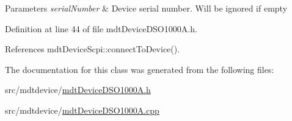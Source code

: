 \begin{DoxyParams}{Parameters}
{\em serial\-Number} & Device serial number. Will be ignored if empty \\
\hline
\end{DoxyParams}


Definition at line 44 of file mdt\-Device\-D\-S\-O1000\-A.\-h.



References mdt\-Device\-Scpi\-::connect\-To\-Device().



The documentation for this class was generated from the following files\-:\begin{DoxyCompactItemize}
\item 
src/mdtdevice/\hyperlink{mdt_device_d_s_o1000_a_8h}{mdt\-Device\-D\-S\-O1000\-A.\-h}\item 
src/mdtdevice/\hyperlink{mdt_device_d_s_o1000_a_8cpp}{mdt\-Device\-D\-S\-O1000\-A.\-cpp}\end{DoxyCompactItemize}
